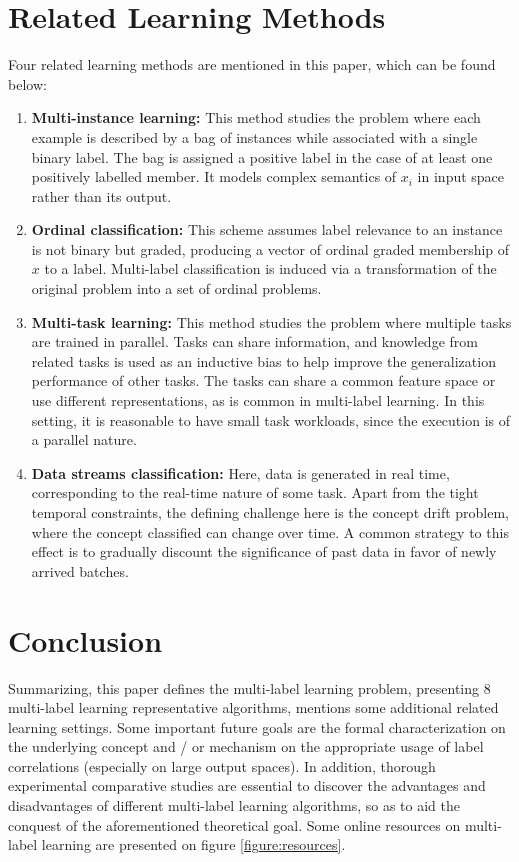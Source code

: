 \documentclass[12pt]{report}
\begin{document}
 	\section*{Related Learning Methods}
 	Four related learning methods are mentioned in this paper, which can be found below:
 	\begin{enumerate}
 		\item \textbf{Multi-instance learning: }This method studies the problem
      where each example is described by a bag of instances while associated
      with a single binary label. The bag is assigned a positive label in the
      case of at least one positively labelled member. It models complex semantics of $x_i$ in input space rather than its output.
 		\item \textbf{Ordinal classification: } This scheme assumes label relevance
      to an instance is not binary but graded, producing a vector of ordinal graded
      membership of $x$ to a label. Multi-label classification is induced via a
      transformation of the original problem into a set of ordinal problems.
 		\item \textbf{Multi-task learning: }This method studies the problem where
      multiple tasks are trained in parallel. Tasks can share information, and
      knowledge from related tasks is used as an inductive bias to help improve
      the generalization performance of other tasks. The  tasks can share a
      common feature space or use different representations, as is common in
      multi-label learning. In this setting, it is reasonable to have small task
      workloads, since the execution is of a parallel nature. 
 		\item \textbf{Data streams classification: } Here, data is generated in real
      time, corresponding to the real-time nature of some task. Apart from the
      tight temporal constraints, the defining challenge here is the concept
      drift problem, where the concept classified can change over time. A common
      strategy to this effect is to gradually discount the significance of past
      data in favor of newly arrived batches.
     
 	\end{enumerate}
 	
	\section*{Conclusion}
	Summarizing, this paper defines the multi-label learning problem, presenting 8
  multi-label learning representative algorithms, mentions some additional
  related learning settings. Some important future goals are the formal
  characterization on the underlying concept and / or mechanism on the
  appropriate usage of label correlations (especially on large output spaces).
  In addition, thorough experimental comparative studies are essential to
  discover the advantages and disadvantages of different multi-label learning
  algorithms, so as to aid the conquest of the aforementioned theoretical goal.
  Some online resources on multi-label learning are presented on figure \ref{figure:resources}.
	
\end{document}
